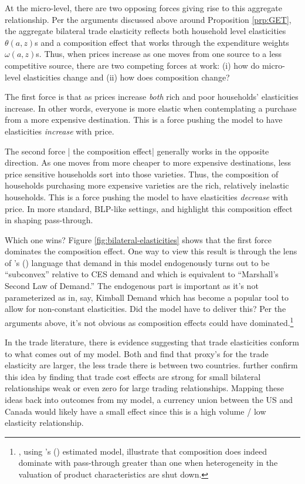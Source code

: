 \documentclass[12pt,pdftex]{article}
\def\citeapos#1{\citeauthor{#1}'s (\citeyear{#1})}
\begin{document}
\begin{onehalfspacing}
At the micro-level, there are two opposing forces giving rise to this aggregate relationship. Per the arguments discussed above around Proposition \ref{prp:GET}, the aggregate bilateral trade elasticity reflects both household level elasticities $\theta(a,z)$s and a composition effect that works through the expenditure weights $\omega(a,z)$s. Thus, when prices increase as one moves from one source to a less competitive source, there are two competing forces at work: (i) how do micro-level elasticities change and (ii) how does composition change?

The first force is that as prices increase \emph{both} rich and poor households' elasticities increase. In other words, everyone is more elastic when contemplating a purchase from a more expensive destination. This is a force pushing the model to have elasticities \emph{increase} with price.

The second force | the composition effect| generally works in the opposite direction. As one moves from more cheaper to more expensive destinations, less price sensitive households sort into those varieties. Thus, the composition of households purchasing more expensive varieties are the rich, relatively inelastic households. This is a force pushing the model to have elasticities \emph{decrease} with price. In more standard, BLP-like settings, \citet{nakamura2010accounting} and \citet*{head2021poor} highlight this composition effect in shaping pass-through.

Which one wins? Figure \ref{fig:bilateral-elasticities} shows that the first force dominates the composition effect. One way to view this result is through the lens of \citeapos{mrazova2017not} language that demand in this model endogenously turns out to be ``subconvex'' relative to CES demand and which is equivalent to ``Marshall's Second Law of Demand.'' The endogenous part is important as it's not parameterized as in, say, Kimball Demand which has become a popular tool to allow for non-constant elasticities. Did the model have to deliver this? Per the arguments above, it's not obvious as composition effects could have dominated.\footnote{\citet{head2021poor}, using \citeapos{berry1995automobile} estimated model, illustrate that composition does indeed dominate with pass-through greater than one when heterogeneity in the valuation of product characteristics are shut down.}

In the trade literature, there is evidence suggesting that trade elasticities conform to what comes out of my model. Both \citet{novy2013international} and \citet*{carrere2020gravity} find that proxy's for the trade elasticity are larger, the less trade there is between two countries. \citet{chen2022gravity} further confirm this idea by finding that trade cost effects are strong for small bilateral relationships weak or even zero for large trading relationships. Mapping these ideas back into outcomes from my model, a currency union between the US and Canada would likely have a small effect since this is a high volume / low elasticity relationship.




\end{onehalfspacing}
\end{document}
